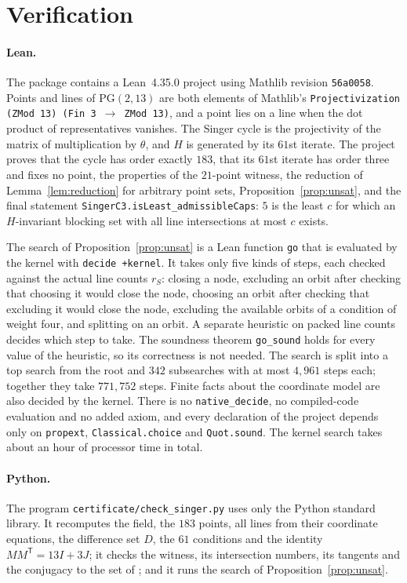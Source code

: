 \documentclass[11pt]{article}
\theoremstyle{remark}
\newcommand{\PG}{\mathrm{PG}(2,13)}
\begin{document}
\section{Verification}\label{sec:verification}

\paragraph{Lean.} The package contains a Lean~4.35.0 project using Mathlib
revision \texttt{56a0058}. Points and lines of $\PG$ are both elements of
Mathlib's \texttt{Projectivization (ZMod 13) (Fin 3 \(\to\) ZMod 13)}, and a
point lies on a line when the dot product of representatives vanishes. The
Singer cycle is the projectivity of the matrix of multiplication by $\theta$,
and $H$ is generated by its $61$st iterate. The project proves that the cycle
has order exactly $183$, that its $61$st iterate has order three and fixes no
point, the properties of the $21$-point witness, the reduction of
Lemma~\ref{lem:reduction} for arbitrary point sets, Proposition~\ref{prop:unsat},
and the final statement \texttt{SingerC3.isLeast\_admissibleCaps}: $5$ is the
least $c$ for which an $H$-invariant blocking set with all line intersections
at most $c$ exists.

The search of Proposition~\ref{prop:unsat} is a Lean function \texttt{go}
that is evaluated by the kernel with \texttt{decide +kernel}. It takes only
five kinds of steps, each checked against the actual line counts $r_S$:
closing a node, excluding an orbit after checking that choosing it would close
the node, choosing an orbit after checking that excluding it would close the
node, excluding the available orbits of a condition of weight four, and
splitting on an orbit. A separate heuristic on packed line counts decides
which step to take. The soundness theorem \texttt{go\_sound} holds for every
value of the heuristic, so its correctness is not needed. The search is split
into a top search from the root and $342$ subsearches with at most $4{,}961$
steps each; together they take $771{,}752$ steps. Finite facts about the
coordinate model are also decided by the kernel. There is no
\texttt{native\_decide}, no compiled-code evaluation and no added axiom, and
every declaration of the project depends only on \texttt{propext},
\texttt{Classical.choice} and \texttt{Quot.sound}. The kernel search takes
about an hour of processor time in total.

\paragraph{Python.} The program \texttt{certificate/check\_singer.py} uses only
the Python standard library. It recomputes the field, the $183$ points, all
lines from their coordinate equations, the difference set $D$, the $61$
conditions and the identity $MM^{\mathsf T}=13I+3J$; it checks the witness,
its intersection numbers, its tangents and the conjugacy to the set of
\cite{BBW}; and it runs the search of Proposition~\ref{prop:unsat}.
\end{document}
